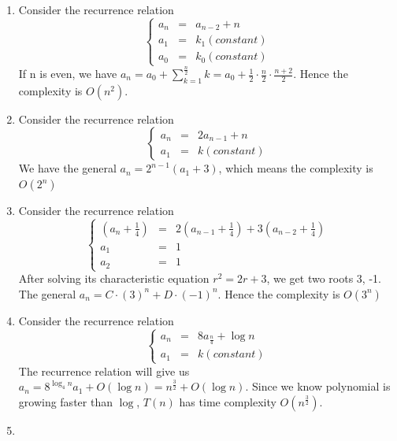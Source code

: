 \documentclass[12pt,a4paper]{article}
\begin{document}
\begin{enumerate}
    \item[(a)] 
        Consider the recurrence relation
        \[
            \left\{
                \begin{matrix}
                    a_n &=& a_{n-2} + n\\
                    a_1 &=& k_1 (constant)\\
                    a_0 &=& k_0 (constant)
                \end{matrix}
            \right.
        \]
        If n is even, we have $a_n = a_0 + \sum_{k=1}^{\frac{n}{2}}k = a_0 + \frac{1}{2}\cdot\frac{n}{2}\cdot\frac{n+2}{2}$. Hence the complexity is $O(n^2)$.
    \item[(b)]
        Consider the recurrence relation
        \[
            \left\{
                \begin{matrix}
                    a_n &=& 2a_{n-1} + n\\
                    a_1 &=& k (constant)
                \end{matrix}
            \right.
        \]
        We have the general $a_n =2^{n-1}(a_1 + 3)$, which means the complexity is $O(2^n)$
    \item[(c)]
    Consider the recurrence relation
    \[
        \left\{
            \begin{matrix}
                (a_n+\frac{1}{4}) &=& 2(a_{n-1}+\frac{1}{4}) + 3(a_{n-2}+\frac{1}{4})\\
                a_1 &=& 1\\
                a_2 &=& 1
            \end{matrix}
        \right.
    \]
    After solving its characteristic equation $r^2 = 2r + 3$, we get two roots 3, -1.
    The general $a_n = C\cdot (3)^n + D\cdot (-1)^n$. Hence the complexity is $O(3^n)$
    \item[(d)]
        Consider the recurrence relation
        \[
            \left\{
                \begin{matrix}
                    a_n &=& 8a_{\frac{n}{4}} + \log n\\
                    a_1 &=& k (constant)
                \end{matrix}
            \right.
        \]
        The recurrence relation will give us $a_n = 8^{\log_{4} n} a_1 + O(\log n) = n^{\frac{3}{2}} + O(\log n)$.
        Since we know polynomial is growing faster than $\log$, $T(n)$ has time complexity $O(n^{\frac{3}{2}})$.
    \item[(e)] 

\end{enumerate}
\end{document}
